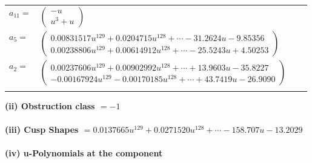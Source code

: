 \documentclass[1p]{elsarticle_modified}
\theoremstyle{definition}
\begin{document}
\begin{tabular}{m{7pt} m{180pt} m{7pt} m{180pt} }
\flushright $a_{11}=$&$\begin{pmatrix}- u\\u^3+u\end{pmatrix}$ \\
\flushright $a_{5}=$&$\begin{pmatrix}0.00831517 u^{129}+0.0204715 u^{128}+\cdots-31.2624 u-9.85356\\0.00238806 u^{129}+0.00614912 u^{128}+\cdots-25.5243 u+4.50253\end{pmatrix}$ \\
\flushright $a_{2}=$&$\begin{pmatrix}0.00237606 u^{129}+0.00902992 u^{128}+\cdots+13.9603 u-35.8227\\-0.00167924 u^{129}-0.00170185 u^{128}+\cdots+43.7419 u-26.9090\end{pmatrix}$\\&\end{tabular}
\flushleft \textbf{(ii) Obstruction class $= -1$}\\~\\
\flushleft \textbf{(iii) Cusp Shapes $= 0.0137665 u^{129}+0.0271520 u^{128}+\cdots-158.707 u-13.2029$}\\~\\
\newpage\renewcommand{\arraystretch}{1}
\flushleft \textbf{(iv) u-Polynomials at the component}\newline \\
\end{document}
